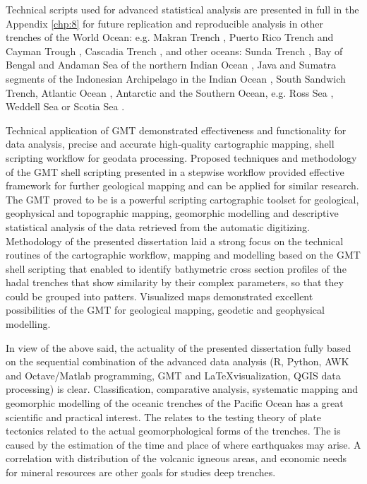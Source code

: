 \documentclass[11pt,a4paper]{report}
\begin{document}
{Technical scripts used for advanced statistical analysis are presented in full in the Appendix \ref{chp:8} for future replication and reproducible analysis in other trenches of the World Ocean: e.g. Makran Trench \cite{Lemenkova202015}, Puerto Rico Trench and Cayman Trough \cite{Lemenkova202018}, Cascadia Trench \cite{Lemenkova202028}, and other oceans: Sunda Trench \cite{Lemenkova202023}, Bay of Bengal and Andaman Sea of the northern Indian Ocean \cite{Lemenkova202029}, Java and Sumatra segments \cite{Lemenkova202027} of the Indonesian Archipelago in the Indian Ocean \cite{Lemenkova202020}, South Sandwich Trench, Atlantic Ocean \cite{Lemenkova202013}, Antarctic and the Southern Ocean, e.g. Ross Sea \cite{Lemenkova202101}, Weddell Sea \cite{Lemenkova202105} or Scotia Sea \cite{Lemenkova202104}.

Technical application of \ac{GMT} demonstrated effectiveness and functionality for data analysis, precise and accurate high-quality cartographic mapping, shell scripting workflow for geodata processing. Proposed techniques and methodology of the \ac{GMT} shell scripting presented in a stepwise workflow provided effective framework for further geological mapping and can be applied for similar research. The \ac{GMT} proved to be is a powerful scripting cartographic toolset for geological, geophysical and topographic mapping, geomorphic modelling  and descriptive statistical analysis of the data retrieved from the automatic digitizing. Methodology of the presented dissertation laid a strong focus on the technical routines of the cartographic workflow, mapping and modelling based on the \ac{GMT} shell scripting that enabled to identify bathymetric cross section profiles of the hadal trenches that show similarity by their complex parameters, so that they could be grouped into patters. Visualized maps demonstrated excellent possibilities of the \ac{GMT} for geological mapping, geodetic and geophysical modelling. 

In view of the above said, the actuality of the presented dissertation fully based on the sequential combination of the advanced data analysis (R, Python, AWK and Octave/Matlab programming, \ac{GMT} and \LaTeX\space visualization, \ac{QGIS} data processing) is clear. Classification, comparative analysis, systematic mapping and geomorphic modelling of the oceanic trenches of the Pacific Ocean has a great scientific and practical interest. The  relates to the testing theory of plate tectonics related to the actual geomorphological forms of the trenches. The  is caused by the estimation of the time and place of where earthquakes may arise. A correlation with distribution of the volcanic igneous areas, and economic needs for mineral resources are other goals for studies deep trenches. 

}
\end{document}
